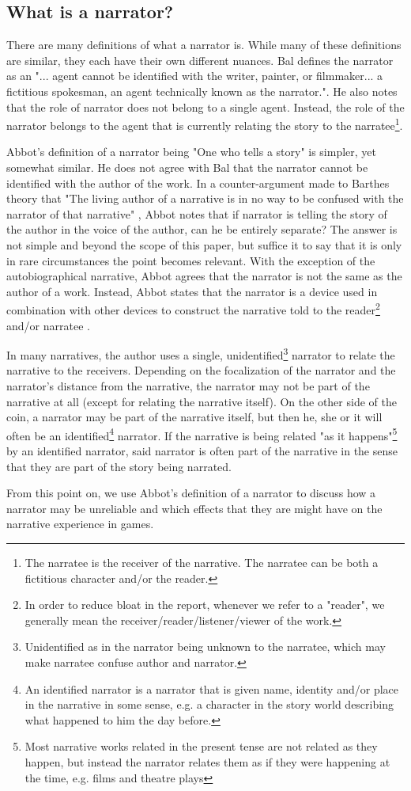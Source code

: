 \subsection{What is a narrator?}
There are many definitions of what a narrator is. 
While many of these definitions are similar, they each have their own different nuances. 
Bal defines the narrator as an "... agent cannot be identified with the writer, painter, or filmmaker... a fictitious spokesman, an agent technically known as the narrator."\cite[p. 8]{Bal}. 
He also notes that the role of narrator does not belong to a single agent. Instead, the role of the narrator belongs to the agent that is currently relating the story to the narratee\footnote{The narratee is the receiver of the narrative. The narratee can be both a fictitious character and/or the reader.}. 

Abbot's definition of a narrator being "One who tells a story"\cite[p. 238]{Abbot} is simpler, yet somewhat similar. 
He does not agree with Bal that the narrator cannot be identified with the author of the work. 
In a counter-argument made to Barthes theory that "The living author of a narrative is in no way to be confused with the narrator of that narrative" \cite[p. 261]{Barthes}, Abbot notes that if narrator is telling the story of the author in the voice of the author, can he be entirely separate? 
The answer is not simple and beyond the scope of this paper, but suffice it to say that it is only in rare circumstances the point becomes relevant. 
With the exception of the autobiographical narrative, Abbot agrees that the narrator is not the same as the author of a work.
Instead, Abbot states that the narrator is a device used in combination with other devices to construct the narrative told to the reader\footnote{In order to reduce bloat in the report, whenever we refer to a "reader", we generally mean the receiver/reader/listener/viewer of the work.} and/or narratee \cite[p. 69]{Abbot}.

In many narratives, the author uses a single, unidentified\footnote{Unidentified as in the narrator being unknown to the narratee, which may make narratee confuse author and narrator.} narrator to relate the narrative to the receivers. 
Depending on the focalization of the narrator and the narrator's distance from the narrative, the narrator may not be part of the narrative at all (except for relating the narrative itself). 
On the other side of the coin, a narrator may be part of the narrative itself, but then he, she or it will often be an identified\footnote{An identified narrator is a narrator that is given name, identity and/or place in the narrative in some sense, e.g. a character in the story world describing what happened to him the day before.} narrator. 
If the narrative is being related "as it happens"\footnote{Most narrative works related in the present tense are not related as they happen, but instead the narrator relates them as if they were happening at the time, e.g. films and theatre plays} by an identified narrator, said narrator is often part of the narrative in the sense that they are part of the story being narrated.

From this point on, we use Abbot's definition of a narrator to discuss how a narrator may be unreliable and which effects that they are might have on the narrative experience in games.